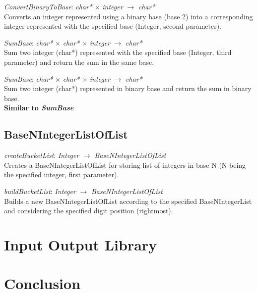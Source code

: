 \documentclass[book, backcover, english, nodocumentinfo]{upmethodology-document}
\begin{document}
		\begin{minipage}{\linewidth}
			\textit{ConvertBinaryToBase}: \textit{char*} $\times$ \textit{integer} $\rightarrow$ \textit{char*}\\
			Converts an integer represented using a binary base (base 2) into a corresponding integer represented with the specified base (Integer, second parameter).
			\label{algo:BNIL-ConvertBinaryToBase}
			
		\end{minipage}
		\nxtalgo{}

		\begin{minipage}{\linewidth}
			\textit{SumBase}: \textit{char*} $\times$  \textit{char*} $\times$  \textit{integer} $\rightarrow$ \textit{char*}\\
			Sum two integer (char*) represented with the specified base (Integer, third parameter) and return the sum in the same base.
			\label{algo:BNIL-SumBase}
			
		\end{minipage}

		\begin{minipage}{\linewidth}
			\textit{SumBase}: \textit{char*} $\times$  \textit{char*} $\times$  \textit{integer} $\rightarrow$ \textit{char*}\\
			Sum two integer (char*) represented in binary base and return the sum in binary base.
			\label{algo:BNIL-SumBinary}\\
			\textbf{Similar to \textit{SumBase}}
		\end{minipage}

	\section{BaseNIntegerListOfList}

		\begin{minipage}{\linewidth}
			\textit{createBucketList}: \textit{Integer} $\rightarrow$ \textit{BaseNIntegerListOfList}\\
			Creates a BaseNIntegerListOfList for storing list of integers in base N (N being the specified integer, first parameter).
			\label{algo:BNIL-CreateBucketList}
			
		\end{minipage}
		\nxtalgo{}

		\begin{minipage}{\linewidth}
			\textit{buildBucketList}: \textit{Integer} $\rightarrow$ \textit{BaseNIntegerListOfList}\\
			Builds a new BaseNIntegerListOfList according to the specified BaseNIntegerList and considering the specified digit position (rightmost).
			\label{algo:BNIL-BuildBucketList}
			
		\end{minipage}
		\nxtalgo{}

\chapter{Input Output Library} \label{chapter:IO-Lib}
\chapter{Conclusion} \label{chapter:Conclusion}
\end{document}

